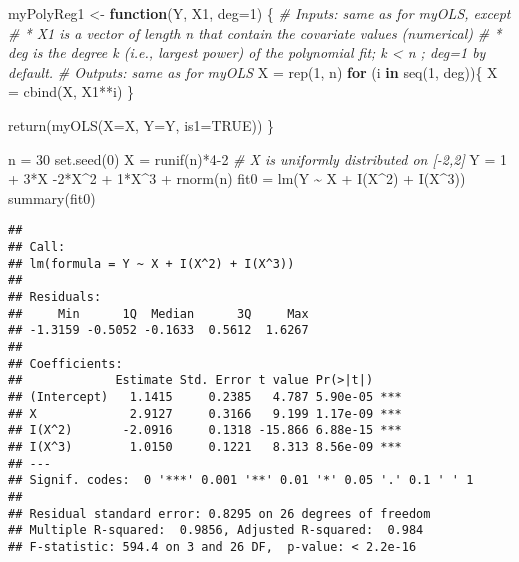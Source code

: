 \documentclass[
  11pt,
]{article}
\newenvironment{Shaded}{\begin{snugshade}}{\end{snugshade}}
\newcommand{\AttributeTok}[1]{\textcolor[rgb]{0.77,0.63,0.00}{#1}}
\newcommand{\CommentTok}[1]{\textcolor[rgb]{0.56,0.35,0.01}{\textit{#1}}}
\newcommand{\ConstantTok}[1]{\textcolor[rgb]{0.00,0.00,0.00}{#1}}
\newcommand{\ControlFlowTok}[1]{\textcolor[rgb]{0.13,0.29,0.53}{\textbf{#1}}}
\newcommand{\DecValTok}[1]{\textcolor[rgb]{0.00,0.00,0.81}{#1}}
\newcommand{\FunctionTok}[1]{\textcolor[rgb]{0.00,0.00,0.00}{#1}}
\newcommand{\NormalTok}[1]{#1}
\newcommand{\OtherTok}[1]{\textcolor[rgb]{0.56,0.35,0.01}{#1}}
\newcommand{\SpecialCharTok}[1]{\textcolor[rgb]{0.00,0.00,0.00}{#1}}
\begin{document}
\begin{Shaded}
\begin{Highlighting}[]
\NormalTok{myPolyReg1 }\OtherTok{\textless{}{-}} \ControlFlowTok{function}\NormalTok{(Y, X1, }\AttributeTok{deg=}\DecValTok{1}\NormalTok{) \{}
\CommentTok{\# Inputs: same as for myOLS, except}
\CommentTok{\# * X1 is a vector of length n that contain the covariate values (numerical)}
\CommentTok{\# * deg is the degree k (i.e., largest power) of the polynomial fit; k \textless{} n ; deg=1 by default.}
\CommentTok{\# Outputs: same as for myOLS}
\NormalTok{  X }\OtherTok{=} \FunctionTok{rep}\NormalTok{(}\DecValTok{1}\NormalTok{, n)}
  \ControlFlowTok{for}\NormalTok{ (i }\ControlFlowTok{in} \FunctionTok{seq}\NormalTok{(}\DecValTok{1}\NormalTok{, deg))\{}
\NormalTok{    X }\OtherTok{=} \FunctionTok{cbind}\NormalTok{(X, X1}\SpecialCharTok{**}\NormalTok{i)}
\NormalTok{  \}}
  
  \FunctionTok{return}\NormalTok{(}\FunctionTok{myOLS}\NormalTok{(}\AttributeTok{X=}\NormalTok{X, }\AttributeTok{Y=}\NormalTok{Y, }\AttributeTok{is1=}\ConstantTok{TRUE}\NormalTok{))}
\NormalTok{\}}
\end{Highlighting}
\end{Shaded}

\begin{Shaded}
\begin{Highlighting}[]
\NormalTok{n }\OtherTok{=} \DecValTok{30} 
\FunctionTok{set.seed}\NormalTok{(}\DecValTok{0}\NormalTok{)}
\NormalTok{X }\OtherTok{=} \FunctionTok{runif}\NormalTok{(n)}\SpecialCharTok{*}\DecValTok{4{-}2} \CommentTok{\# X is uniformly distributed on [{-}2,2]}
\NormalTok{Y }\OtherTok{=} \DecValTok{1} \SpecialCharTok{+} \DecValTok{3}\SpecialCharTok{*}\NormalTok{X }\SpecialCharTok{{-}}\DecValTok{2}\SpecialCharTok{*}\NormalTok{X}\SpecialCharTok{\^{}}\DecValTok{2} \SpecialCharTok{+} \DecValTok{1}\SpecialCharTok{*}\NormalTok{X}\SpecialCharTok{\^{}}\DecValTok{3} \SpecialCharTok{+} \FunctionTok{rnorm}\NormalTok{(n)}
\NormalTok{fit0 }\OtherTok{=} \FunctionTok{lm}\NormalTok{(Y }\SpecialCharTok{\textasciitilde{}}\NormalTok{ X }\SpecialCharTok{+} \FunctionTok{I}\NormalTok{(X}\SpecialCharTok{\^{}}\DecValTok{2}\NormalTok{) }\SpecialCharTok{+} \FunctionTok{I}\NormalTok{(X}\SpecialCharTok{\^{}}\DecValTok{3}\NormalTok{))}
\FunctionTok{summary}\NormalTok{(fit0)}
\end{Highlighting}
\end{Shaded}

\begin{verbatim}
## 
## Call:
## lm(formula = Y ~ X + I(X^2) + I(X^3))
## 
## Residuals:
##     Min      1Q  Median      3Q     Max 
## -1.3159 -0.5052 -0.1633  0.5612  1.6267 
## 
## Coefficients:
##             Estimate Std. Error t value Pr(>|t|)    
## (Intercept)   1.1415     0.2385   4.787 5.90e-05 ***
## X             2.9127     0.3166   9.199 1.17e-09 ***
## I(X^2)       -2.0916     0.1318 -15.866 6.88e-15 ***
## I(X^3)        1.0150     0.1221   8.313 8.56e-09 ***
## ---
## Signif. codes:  0 '***' 0.001 '**' 0.01 '*' 0.05 '.' 0.1 ' ' 1
## 
## Residual standard error: 0.8295 on 26 degrees of freedom
## Multiple R-squared:  0.9856, Adjusted R-squared:  0.984 
## F-statistic: 594.4 on 3 and 26 DF,  p-value: < 2.2e-16
\end{verbatim}
\end{document}
